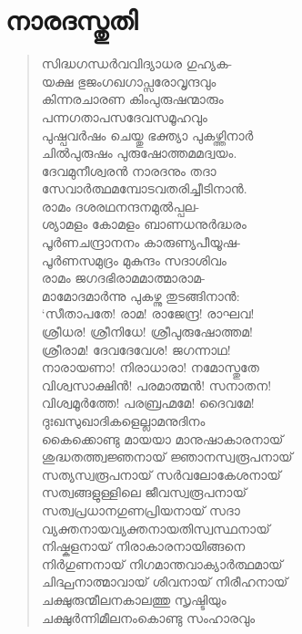 
\section{നാരദസ്തുതി}

\begin{verse}
സിദ്ധഗന്ധര്‍വവിദ്യാധര ഗുഹ്യക-\\
യക്ഷ ഭുജംഗഖഗാപ്സരോവൃന്ദവും\\
കിന്നരചാരണ കിംപുരുഷന്മാരും\\
പന്നഗതാപസദേവസമൂഹവും\\
പുഷ്പവര്‍ഷം ചെയ്തു ഭക്ത്യാ പുകഴ്ത്തിനാര്‍\\
ചില്‍പുരുഷം പുരുഷോത്തമമദ്വയം.\\
ദേവമുനീശ്വരന്‍ നാരദനും തദാ\\
സേവാര്‍ത്ഥമമ്പോടവതരിച്ചീടിനാന്‍.\\
രാമം ദശരഥനന്ദനമുല്‍പ്പല-\\
ശ്യാമളം കോമളം ബാണധനുര്‍ദ്ധരം\\
പൂര്‍ണചന്ദ്രാനനം കാരുണ്യപീയൂഷ-\\
പൂര്‍ണസമുദ്രം മുകുന്ദം സദാശിവം\\
രാമം ജഗദഭിരാമമാത്മാരാമ-\\
മാമോദമാര്‍ന്നു പുകഴ്ന്നു തുടങ്ങിനാന്‍:\\
‘സീതാപതേ! രാമ! രാജേന്ദ്ര! രാഘവ!\\
ശ്രീധര! ശ്രീനിധേ! ശ്രീപുരുഷോത്തമ!\\
ശ്രീരാമ! ദേവദേവേശ! ജഗന്നാഥ!\\
നാരായണാ! നിരാധാരാ! നമോസ്തുതേ\\
വിശ്വസാക്ഷിന്‍! പരമാത്മന്‍! സനാതന!\\
വിശ്വമൂര്‍ത്തേ! പരബ്രഹ്മമേ! ദൈവമേ!\\
ദുഃഖസുഖാദികളെല്ലാമനുദിനം\\
കൈക്കൊണ്ടു മായയാ മാനുഷാകാരനായ്\\
ശുദ്ധതത്ത്വജ്ഞനായ് ജ്ഞാനസ്വരൂപനായ്\\
സത്യസ്വരൂപനായ് സര്‍വലോകേശനായ്\\
സത്വങ്ങളുള്ളിലെ ജീവസ്വരൂപനായ്\\
സത്വപ്രധാനഗുണപ്രിയനായ് സദാ\\
വ്യക്തനായവ്യക്തനായതിസ്വസ്ഥനായ്\\
നിഷ്കളനായ് നിരാകാരനായിങ്ങനെ\\
നിര്‍ഗുണനായ് നിഗമാന്തവാക്യാര്‍ത്ഥമായ്\\
ചിദ്ഘനാത്മാവായ് ശിവനായ് നിരീഹനായ്\\
ചക്ഷുരുന്മീലനകാലത്തു സൃഷ്ടിയും\\
ചക്ഷുര്‍ന്നിമീലനംകൊണ്ടു സംഹാരവും\\

\end{verse}
